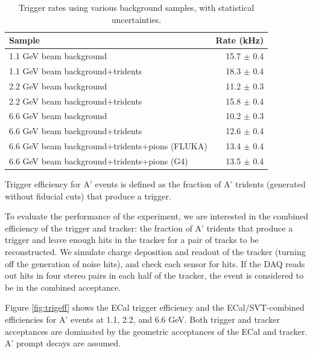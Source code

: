 \begin{table}
	\begin{tabular}{|l|r|}
		\hline
		Sample &  Rate (kHz)\\
		\hline
		1.1 GeV	beam background 				& 15.7 $\pm$ 0.4	\\
		1.1 GeV beam background+tridents			& 18.3 $\pm$ 0.4	\\
		2.2 GeV	beam background 				& 11.2 $\pm$ 0.3	\\
		2.2 GeV beam background+tridents			& 15.8 $\pm$ 0.4	\\
		6.6 GeV	beam background 				& 10.2 $\pm$ 0.3	\\
		6.6 GeV beam background+tridents			& 12.6 $\pm$ 0.4	\\
		6.6 GeV beam background+tridents+pions (FLUKA)	& 13.4 $\pm$ 0.4	\\
		6.6 GeV beam background+tridents+pions (G4)	& 13.5 $\pm$ 0.4	\\
		\hline
	\end{tabular}
	\caption{ {\small Trigger rates using various background samples, with statistical uncertainties. }
	\label{tab:trigrates}}
\end{table}

Trigger efficiency for A' events is defined as the fraction of A' tridents (generated without fiducial cuts) that produce a trigger.

To evaluate the performance of the experiment, we are interested in the combined efficiency of the trigger and tracker: the fraction of A' tridents that produce a trigger and leave enough hits in the tracker for a pair of tracks to be reconstructed.
We simulate charge deposition and readout of the tracker (turning off the generation of noise hits), and check each sensor for hits. 
If the DAQ reads out hits in four stereo pairs in each half of the tracker, the event is considered to be in the combined acceptance.

Figure \ref{fig:trigeff} shows the ECal trigger efficiency and the ECal/SVT-combined efficiencies for A' events at 1.1, 2.2, and 6.6 GeV. 
Both trigger and tracker acceptances are dominated by the geometric acceptances of the ECal and tracker.
A' prompt decays are assumed.

